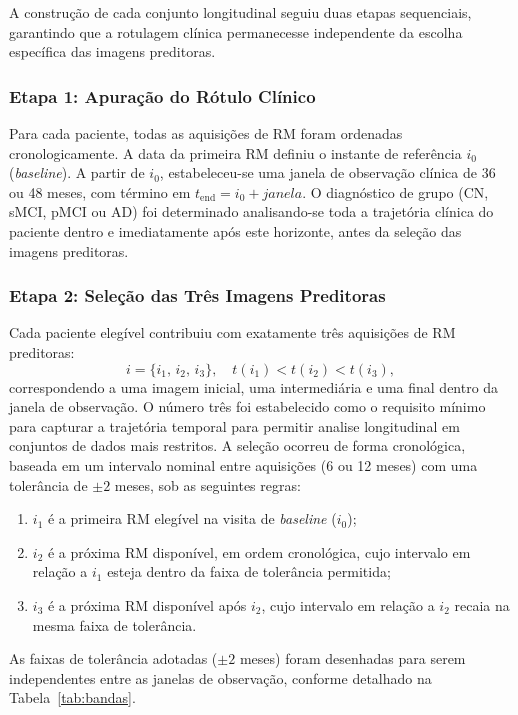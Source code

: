 \documentclass[review]{elsarticle}
\begin{document}
A construção de cada conjunto longitudinal seguiu duas etapas sequenciais, garantindo que a rotulagem clínica permanecesse independente da escolha específica das imagens preditoras.

\subsubsection{Etapa 1: Apuração do Rótulo Clínico}
Para cada paciente, todas as aquisições de RM foram ordenadas cronologicamente. A data da primeira RM definiu o instante de referência $i_0$ (\textit{baseline}). A partir de $i_0$, estabeleceu-se uma janela de observação clínica de 36 ou 48 meses, com término em $t_{\mathrm{end}} = i_0 + janela$. O diagnóstico de grupo (CN, sMCI, pMCI ou AD) foi determinado analisando-se toda a trajetória clínica do paciente dentro e imediatamente após este horizonte, antes da seleção das imagens preditoras.

\subsubsection{Etapa 2: Seleção das Três Imagens Preditoras}
Cada paciente elegível contribuiu com exatamente três aquisições de RM preditoras:
\begin{equation}
	i=\{i_1,\,i_2,\,i_3\},
	\quad t(i_1)<t(i_2)<t(i_3),
\end{equation}
correspondendo a uma imagem inicial, uma intermediária e uma final dentro da janela de observação. O número três foi estabelecido como o requisito mínimo para capturar a trajetória temporal para permitir analise longitudinal em conjuntos de dados mais restritos. A seleção ocorreu de forma cronológica, baseada em um intervalo nominal entre aquisições (6 ou 12 meses) com uma tolerância de $\pm 2$ meses, sob as seguintes regras:

\begin{enumerate}
	\item $i_1$ é a primeira RM elegível na visita de \textit{baseline} ($i_0$);
	\item $i_2$ é a próxima RM disponível, em ordem cronológica, cujo intervalo em relação a $i_1$ esteja dentro da faixa de tolerância permitida;
	\item $i_3$ é a próxima RM disponível após $i_2$, cujo intervalo em relação a $i_2$ recaia na mesma faixa de tolerância.
\end{enumerate}

As faixas de tolerância adotadas ($\pm 2$ meses) foram desenhadas para serem independentes entre as janelas de observação, conforme detalhado na Tabela~\ref{tab:bandas}.
\end{document}

